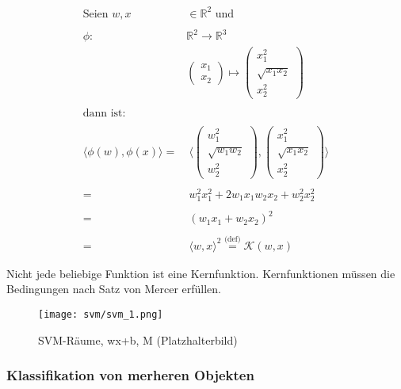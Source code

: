 \begin{equation}
\label{eq:svm_kernel_example}
\begin{split}
    \text{Seien } w,x & \in \mathbb{R}^2 \text{ und}\\
    \\
    \phi : & \mathbb{R}^2 \to \mathbb{R}^3\\
    & \begin{pmatrix}
    x_1 \\
    x_2
    \end{pmatrix}
    \mapsto
    \begin{pmatrix}
    x_1^2 \\
    \sqrt{x_1x_2} \\
    x_2^2
    \end{pmatrix}\\
    \\
    \text{dann ist:} &\\
    \\
    \langle \phi(w),\phi(x) \rangle = & \:\langle \begin{pmatrix}
    w_1^2 \\
    \sqrt{w_1w_2} \\
    w_2^2
    \end{pmatrix},
    \begin{pmatrix}
    x_1^2 \\
    \sqrt{x_1x_2} \\
    x_2^2
    \end{pmatrix} \rangle \\
    \\
    = & \:w_1^2x_1^2 + 2 w_1x_1w_2x_2 + w_2^2x_2^2 \\
    \\
    = & \:(w_1x_1 + w_2x_2)^2 \\
    \\
    = & \:\langle w,x \rangle^2 \overset{\text{(def)}}= \mathcal{K}(w,x)
\end{split}
\end{equation}

Nicht jede beliebige Funktion ist eine Kernfunktion. Kernfunktionen müssen die Bedingungen nach Satz von Mercer \cite[S. 127]{Marsland} erfüllen.

\begin{figure}[htbp] \centering
    \texttt{[image: svm/svm\_1.png]}
    \caption{SVM-Räume, wx+b, M (Platzhalterbild)}
    \label{fig:svm1}
\end{figure}

\subsubsection{Klassifikation von merheren Objekten}


